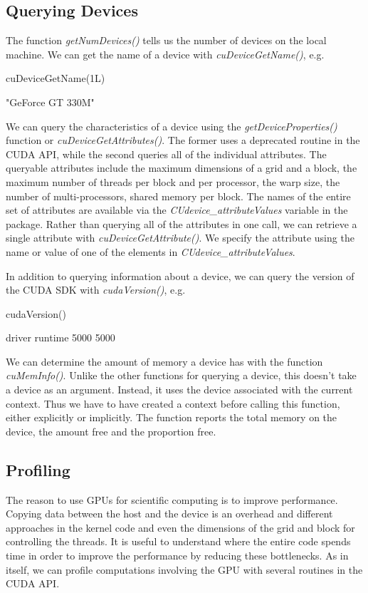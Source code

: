 \documentclass[article]{jss}
\def\R{\proglang{R}}
\def\Rfunc#1{\textsl{#1()}}
\def\Rvar#1{\textsl{#1}}
\begin{document}
\subsection{Querying Devices}
The function \Rfunc{getNumDevices} tells us the number of devices on
the local machine.  
We can get the name of a device with \Rfunc{cuDeviceGetName}, e.g.
\begin{RCode}
cuDeviceGetName(1L)
\end{RCode}
\begin{ROutput}
[1] "GeForce GT 330M"
\end{ROutput}
We can query the characteristics of a device using
the \Rfunc{getDeviceProperties} function or
\Rfunc{cuDeviceGetAttributes}.  The former uses a deprecated routine
in the CUDA API, while the second queries all of the individual
attributes.  The queryable attributes include the maximum dimensions
of a grid and a block, the maximum number of threads per block and per
processor, the warp size, the number of multi-processors, shared
memory per block.  The names of the entire set of attributes are
available  via the \Rvar{CUdevice\_attributeValues} variable in the package.
Rather than querying all of the attributes in one call,
we can retrieve a single attribute with \Rfunc{cuDeviceGetAttribute}.
We specify the attribute using the name or value of one 
of the elements in \Rvar{CUdevice\_attributeValues}.


In addition to querying information about a device,
we can query the version of the CUDA SDK with
\Rfunc{cudaVersion}, e.g.
\begin{RCode}
cudaVersion()
\end{RCode}
\begin{ROutput}
 driver runtime 
   5000    5000 
\end{ROutput}


We can determine the amount of memory a device has with the function
\Rfunc{cuMemInfo}. Unlike the other functions for querying a device,
this doesn't take a device as an argument. Instead, it uses the device
associated with the current context.  Thus we have to have created a
context before calling this function, either explicitly or implicitly.
The function reports the total memory on the device, the amount free
and the proportion free.


\subsection{Profiling}
The reason to use GPUs for scientific computing is to improve
performance. Copying data between the host and the device is an
overhead and different approaches in the kernel code and even the
dimensions of the grid and block for controlling the threads.  It is
useful to understand where the entire code spends time in order to
improve the performance by reducing these bottlenecks.  As in \R{}
itself, we can profile computations involving the GPU with several
routines in the CUDA API.
\end{document}
